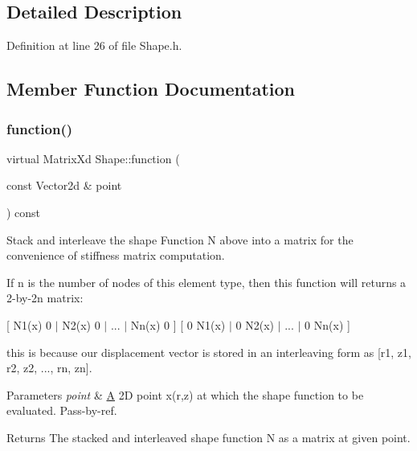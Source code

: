 \subsection{Detailed Description}


Definition at line 26 of file Shape.\+h.



\subsection{Member Function Documentation}
\mbox{\label{class_shape_ab6e0d64b40e09c176ce2ece24bc94a37}} 
\subsubsection{\texorpdfstring{function()}{function()}}
{\footnotesize\ttfamily virtual Matrix\+Xd Shape\+::function (\begin{DoxyParamCaption}\item[{const Vector2d \&}]{point }\end{DoxyParamCaption}) const\hspace{0.3cm}{\ttfamily [pure virtual]}}



Stack and interleave the shape Function N above into a matrix for the convenience of stiffness matrix computation. 

If n is the number of nodes of this element type, then this function will returns a 2-\/by-\/2n matrix\+:

\mbox{[} N1(x) 0 $\vert$ N2(x) 0 $\vert$ ... $\vert$ Nn(x) 0 \mbox{]} \mbox{[} 0 N1(x) $\vert$ 0 N2(x) $\vert$ ... $\vert$ 0 Nn(x) \mbox{]}

this is because our displacement vector is stored in an interleaving form as \mbox{[}r1, z1, r2, z2, ..., rn, zn\mbox{]}.


\begin{DoxyParams}{Parameters}
{\em point} & \mbox{\hyperlink{class_a}{A}} 2D point x(r,z) at which the shape function to be evaluated. Pass-\/by-\/ref. \\
\hline
\end{DoxyParams}
\begin{DoxyReturn}{Returns}
The stacked and interleaved shape function N as a matrix at given point. 
\end{DoxyReturn}


